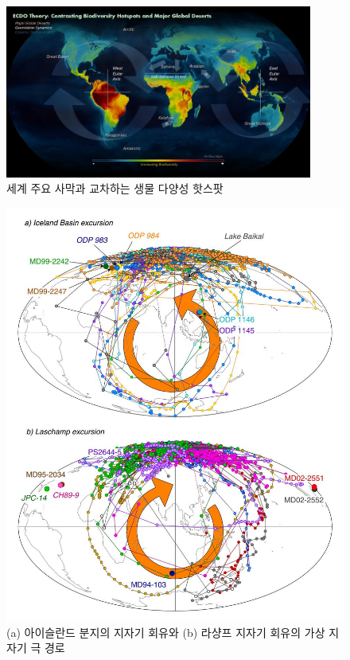 \documentclass[10pt,twocolumn,letterpaper]{article}
\begin{document}
\begin{figure}[t]
\begin{center}
\includegraphics[width=0.9\textwidth]{biodiversity.jpg}
\end{center}
   \caption{세계 주요 사막과 교차하는 생물 다양성 핫스팟 \cite{28}}
\label{fig:9}
\end{figure}

\begin{figure}[t]
\begin{center}
   \includegraphics[width=0.95\linewidth]{laj.jpg}
\end{center}
   \caption{(a) 아이슬란드 분지의 지자기 회유와 (b) 라샹프 지자기 회유의 가상 지자기 극 경로 \cite{35}}
\label{fig:7}
\label{fig:onecol}
\end{figure}
\end{document}
